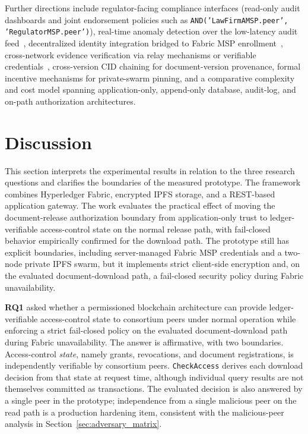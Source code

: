 \documentclass[preprint,12pt]{elsarticle}
\begin{document}
Further directions include regulator-facing compliance interfaces
(read-only audit dashboards and joint endorsement policies such as
\texttt{AND(}\allowbreak\texttt{'LawFirmAMSP.peer',}
\texttt{'RegulatorMSP.peer')}), real-time anomaly
detection over the low-latency audit feed~\cite{siddamsetti2024anomaly},
decentralized identity integration bridged to Fabric MSP
enrollment~\cite{sporny2023did}, cross-network evidence verification via
relay mechanisms or verifiable credentials~\cite{sporny2022vc},
cross-version CID chaining for document-version provenance, formal
incentive mechanisms for private-swarm pinning, and a comparative
complexity and cost model spanning application-only, append-only database,
audit-log, and on-path authorization architectures.
\FloatBarrier
\section{Discussion}
\label{sec:discussion}

This section interprets the experimental results in relation to the three
research questions and clarifies the boundaries of the measured prototype.
The framework combines Hyperledger Fabric, encrypted IPFS storage, and a
REST-based application gateway. The work evaluates the
practical effect of moving the document-release authorization boundary from
application-only trust to ledger-verifiable access-control state on the
normal release path, with fail-closed behavior empirically confirmed for the
download path. The prototype still has explicit boundaries, including
server-managed Fabric MSP credentials and a two-node private IPFS swarm, but
it implements strict client-side encryption and, on the evaluated
document-download path, a fail-closed security policy during Fabric
unavailability.

\textbf{RQ1} asked whether a permissioned blockchain architecture can
provide ledger-verifiable access-control state to consortium peers
under normal operation while enforcing a strict fail-closed policy on
the evaluated document-download path during Fabric unavailability. The
answer is affirmative, with two boundaries. Access-control \emph{state}, namely
grants, revocations, and document registrations, is independently
verifiable by consortium peers. \texttt{CheckAccess} derives each download
decision from that state at request time, although individual query results
are not themselves committed as transactions. The evaluated decision is
also answered by a single peer in the prototype; independence from a single
malicious peer on the read path is a production hardening item, consistent
with the malicious-peer analysis in Section~\ref{sec:adversary_matrix}.
\end{document}
